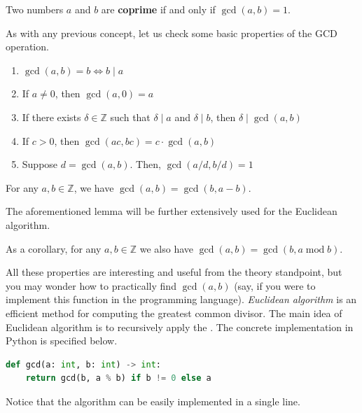 \documentclass[../lecture-notes.tex]{subfiles}
\begin{document}
\begin{definition}
    Two numbers $a$ and $b$ are \textbf{coprime} if and only if $\gcd(a, b) = 1$.
\end{definition}

As with any previous concept, let us check some basic properties of the GCD operation.

\begin{lemma} 
    \hfil
    \begin{enumerate}
        \item $\gcd(a, b) = b \iff b \mid a$
        \item If $a \neq 0$, then $\gcd(a, 0) = a$
        \item If there exists $\delta \in \mathbb{Z}$ such that $\delta \mid a$ and $\delta \mid b$, then $\delta \mid \gcd(a, b)$
        \item If $c > 0$, then $\gcd(ac, bc) = c \cdot \gcd(a, b)$
        \item Suppose $d = \gcd(a, b)$. Then, $\gcd(a/d, b/d) = 1$
    \end{enumerate}
\end{lemma}

\begin{lemma}
    For any $a,b \in \mathbb{Z}$, we have $\gcd(a, b) = \gcd(b, a - b)$. 
\end{lemma}

The aforementioned lemma will be further extensively used for the Euclidean algorithm.

\begin{corollary}\label{cor:euclidean}
    As a corollary, for any $a,b \in \mathbb{Z}$ we also have $\gcd(a, b) =
    \gcd(b, a \; \text{mod} \; b)$.
\end{corollary}

All these properties are interesting and useful from the theory standpoint, but
you may wonder how to practically find $\gcd(a, b)$ (say, if you were to
implement this function in the programming language). \emph{Euclidean algorithm} is an
efficient method for computing the greatest common divisor. The main idea of 
Euclidean algorithm is to recursively apply the . The concrete implementation 
in Python is specified below. 
\begin{lstlisting}[language=Python]
def gcd(a: int, b: int) -> int:
    return gcd(b, a % b) if b != 0 else a
\end{lstlisting}

Notice that the algorithm can be easily implemented in a single line.
\end{document}
